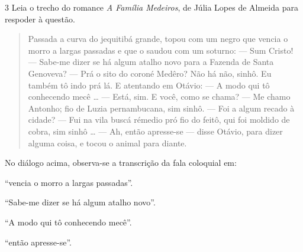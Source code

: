\num{3} Leia o trecho do romance \textit{A Família Medeiros}, de Júlia Lopes de Almeida para 
respoder à questão. 

\begin{quote}

Passada a curva do jequitibá grande, topou com um negro
que vencia o morro a largas passadas e que o saudou com um
soturno:
--- Sum Cristo!
--- Sabe-me dizer se há algum atalho novo para a Fazenda de
Santa Genoveva?
--- Prá o sito do coroné Medêro? Não há não, sinhô. Eu
também tô indo prá lá.
E atentando em Otávio:
--- A modo qui tô conhecendo mecê \ldots{}
--- Está, sim. E você, como se chama?
--- Me chamo Antonho; fio de Luzia pernambucana, sim sinhô.
--- Foi a algum recado à cidade?
--- Fui na vila buscá rémedio pró fio do feitô, qui foi moldido
de cobra, sim sinhô \ldots{}
--- Ah, então apresse-se --- disse Otávio, para dizer alguma
coisa, e tocou o animal para diante.
\end{quote}



No diálogo acima, observa-se a transcrição da fala coloquial em:

\begin{escolha}
  
  \item ``vencia o morro a largas passadas''.
  
  \item ``Sabe-me dizer se há algum atalho novo''. 
  
  \item ``A modo qui tô conhecendo mecê''.
  
  \item ``então apresse-se''. 

\end{escolha}
